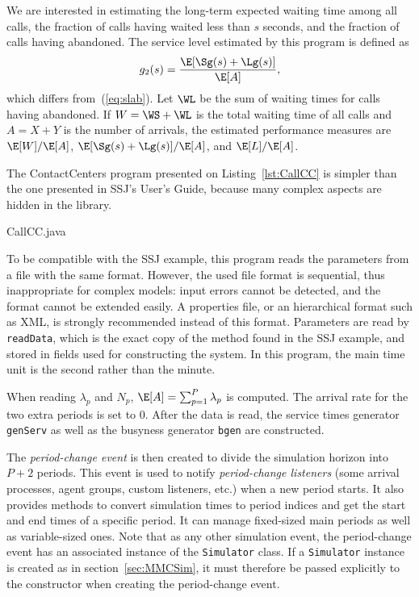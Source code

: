 We are interested in estimating the long-term expected waiting time
among all calls, the fraction of calls having waited less than $s$
seconds, and the fraction of calls having abandoned.
The service level estimated by this program is defined as
\begin{equation}
g_2(s)=\frac{\E[\Sg(s) + \Lg(s)]}{\E[A]},\label{eq:sl2}
\end{equation}
which differs from~(\ref{eq:slab}).
Let $\WL$ be the sum of waiting times for calls having abandoned.
If $W=\WS+\WL$ is the total waiting time of all calls and
$A=X+Y$ is the number of
arrivals, the estimated performance measures are $\E[W]/\E[A]$,
$\E[\Sg(s) + \Lg(s)]/\E[A]$, and $\E[L]/\E[A]$.

The ContactCenters program presented on
Listing~\ref{lst:CallCC} is simpler than the one presented in SSJ's
User's Guide, because many complex aspects are hidden in the library.


{CallCC.java}

To be compatible with the SSJ example, this program reads the
parameters from a file with the same format.
However, the used file format is sequential, thus inappropriate for
complex models: input errors cannot be detected, and the format cannot
be extended easily.
A properties file, or an hierarchical format such as XML, is
strongly recommended instead of this format.
Parameters are read by
\texttt{read\-Data}, which is the exact
copy of the method found in the SSJ example,  and
stored in fields used for constructing the system.
In this program, the main time unit is the second rather than the
minute.

When reading $\lambda_p$ and $N_p$, $\E[A]=\sum_{p=1}^P\lambda_p$ is
computed.  The arrival rate for the two extra periods is set to 0.
After the data is read, the service times generator \texttt{gen\-Serv}
as well as the busyness generator \texttt{bgen}
are constructed.

The \emph{period-change event} is then created
to divide the simulation horizon into $P+2$ periods.
This event
is used to notify \emph{period-change listeners} (some arrival
processes,
agent groups, custom listeners, etc.)
when a new period starts.  It also provides
methods to convert simulation times to period indices and get the
start and
end times of a specific period.  It can manage fixed-sized main periods as
well as variable-sized ones.
Note that as any other simulation event, the period-change event has
an associated instance of the \texttt{Simulator} class.
If a \texttt{Simulator} instance is created
as in section~\ref{sec:MMCSim},
it must therefore be passed
explicitly to the constructor when creating the period-change event.

